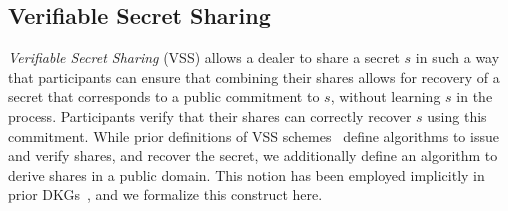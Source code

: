 \subsection{Verifiable Secret Sharing} \label{verifiable-tss}


\emph{Verifiable Secret Sharing} (VSS) allows a dealer to share a secret $s$ in such a way that
participants can ensure that combining their shares allows for recovery of a secret that corresponds to a public commitment to $s$, without learning $s$ in the process.
%
Participants verify that their shares can correctly recover $s$ using this commitment.
While prior definitions of VSS schemes~\cite{KatzLindell2014} define algorithms to issue and verify shares, and recover the secret,
we additionally define an algorithm to derive shares in a public domain.
This notion has been employed implicitly in prior DKGs~\cite{KomloG20}, and we formalize this construct here.

